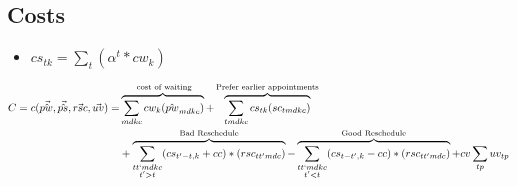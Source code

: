 \subsection{Costs}

\begin{itemize}
	\item $cs_{tk} = \sum_t (\alpha^t * cw_{k})$
\end{itemize}

\begin{equation}\begin{alignedat}{10}
		& C = c(\vec{\hat{pw}}, \vec{\hat{ps}}, \vec{rsc}, \vec{uv}) = 
		&& 
		\overbrace{ \sum_{mdkc} cw_{k} (\hat{pw}_{mdkc}) }^\text{
			cost of waiting}  + 
		\overbrace{
			\sum_{tmdkc} cs_{tk} (sc_{tmdkc})
		}^\text{Prefer earlier appointments} \\ 
		&	&&  +
		\overbrace{
			\sum_{
				\substack{tt`mdkc \\ t' > t}} 
			(cs_{t'-t, k} + cc) * (rsc_{tt'mdc})}^\text{Bad Reschedule} - 
		\overbrace{ 
			\sum_{
				\substack{tt`mdkc \\ t' < t}}
			(cs_{t-t', k} - cc) * (rsc_{tt'mdc})}^\text{Good Reschedule} + 
		cv \sum_{tp} uv_{tp}
\end{alignedat}\end{equation}